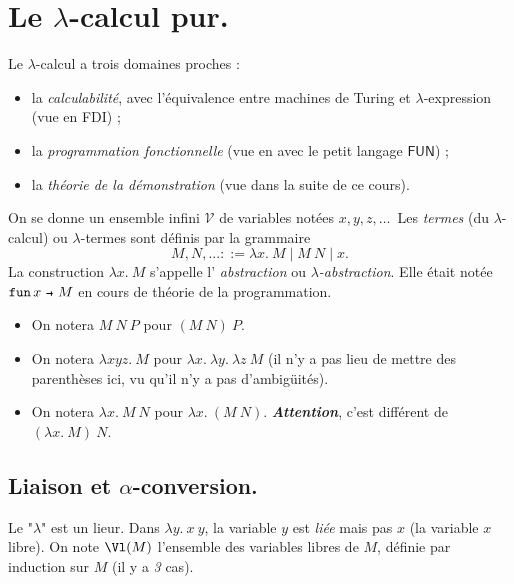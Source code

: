 \documentclass[./main]{subfiles}
\begin{document}
  \chapter{Le $\lambda$-calcul pur.}

  Le $\lambda$-calcul a trois domaines proches :
  \begin{itemize}
    \item la \textit{calculabilité}, avec l'équivalence entre machines de Turing et $\lambda$-expression (vue en FDI) ;
    \item la \textit{programmation fonctionnelle} (vue en  avec le petit langage $\mathsf{FUN}$) ;
    \item la \textit{théorie de la démonstration} (vue dans la suite de ce cours).
  \end{itemize}

  On se donne un ensemble infini $\mathcal{V}$ de variables notées $x, y, z,\ldots$\
  Les \textit{termes} (du $\lambda$-calcul) ou $\lambda$-termes sont définis par la grammaire \[
  M, N, ... ::= \lambda x.\: M  \mid M \: N  \mid x
  .\]
  La construction $\lambda x.\: M$ s'appelle l' \textit{abstraction} ou  \textit{$\lambda$-abstraction}.
  Elle était notée $\fun x M$ en cours de théorie de la programmation.

  \begin{nota}
    \begin{itemize}
      \item On notera $M \: N \: P$ pour  $(M \: N) \: P$.
      \item On notera  $\lambda x y z. \: M$ pour  $\lambda x. \: \lambda y. \: \lambda z \: M$ (il n'y a pas lieu de mettre des parenthèses ici, vu qu'il n'y a pas d'ambigüités).
      \item On notera  $\lambda x. \: M \: N$ pour  $\lambda x. \: (M \: N)$.  \textit{\textbf{Attention}}, c'est différent de $(\lambda x.\: M) \: N$.
    \end{itemize}
  \end{nota}

  \section{Liaison et $\alpha$-conversion.}

  \begin{rmk}[Liaison]
    Le "$\lambda$" est un lieur.
    Dans $\lambda y. \: x \: y$, la variable  $y$ est \textit{liée} mais pas $x$ (la variable $x$ libre).
    On note $\Vl(M)$ l'ensemble des variables libres de  $M$, définie par induction sur $M$ (il y a \textit{3} cas).
  \end{rmk}
\end{document}
